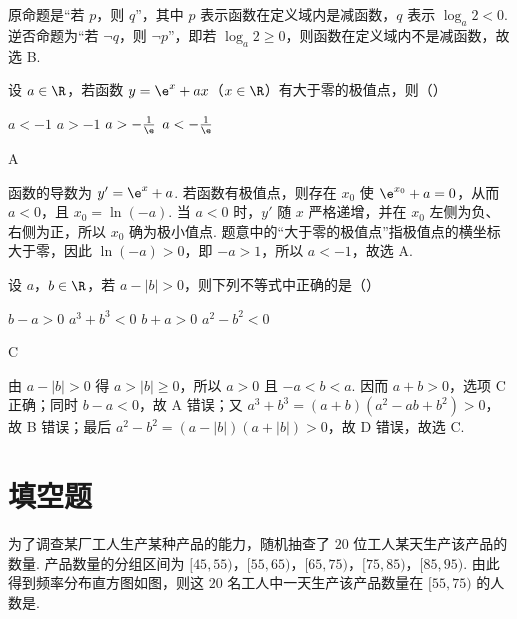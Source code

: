 \begin{solution}
原命题是“若 \(p\)，则 \(q\)”，其中 \(p\) 表示函数在定义域内是减函数，\(q\) 表示 \(\log_a2<0\). 逆否命题为“若 \(\lnot q\)，则 \(\lnot p\)”，即若 \(\log_a2\geqslant0\)，则函数在定义域内不是减函数，故选 B.
\end{solution}

\begin{problem}
设 \(a \in \R\)，若函数 \(y = \e^x + ax\)（\(x \in \R\)）有大于零的极值点，则（\quad）

\choices
    {\(a < -1\)}
    {\(a > -1\)}
    {\(a > -\frac{1}{\e}\)}
    {\(a < -\frac{1}{\e}\)}
\end{problem}

\begin{answer}
A
\end{answer}

\begin{solution}
函数的导数为 \(y'=\e^x+a\). 若函数有极值点，则存在 \(x_0\) 使 \(\e^{x_0}+a=0\)，从而 \(a<0\)，且 \(x_0=\ln(-a)\). 当 \(a<0\) 时，\(y'\) 随 \(x\) 严格递增，并在 \(x_0\) 左侧为负、右侧为正，所以 \(x_0\) 确为极小值点. 题意中的“大于零的极值点”指极值点的横坐标大于零，因此 \(\ln(-a)>0\)，即 \(-a>1\)，所以 \(a<-1\)，故选 A.
\end{solution}

\begin{problem}
设 \(a\)，\(b \in \R\)，若 \(a - |b| > 0\)，则下列不等式中正确的是（\quad）

\choices
    {\(b - a > 0\)}
    {\(a^3 + b^3 < 0\)}
    {\(b + a > 0\)}
    {\(a^2 - b^2 < 0\)}
\end{problem}

\begin{answer}
C
\end{answer}

\begin{solution}
由 \(a-|b|>0\) 得 \(a>|b|\geqslant0\)，所以 \(a>0\) 且 \(-a<b<a\). 因而 \(a+b>0\)，选项 C 正确；同时 \(b-a<0\)，故 A 错误；又
\(a^3+b^3=(a+b)(a^2-ab+b^2)>0\)，故 B 错误；最后 \(a^2-b^2=(a-|b|)(a+|b|)>0\)，故 D 错误，故选 C.
\end{solution}

\section{填空题}

\begin{problem}
为了调查某厂工人生产某种产品的能力，随机抽查了 \(20\) 位工人某天生产该产品的数量. 产品数量的分组区间为 \([45, 55)\)，\([55, 65)\)，\([65, 75)\)，\([75, 85)\)，\([85, 95)\). 由此得到频率分布直方图如图，则这 \(20\) 名工人中一天生产该产品数量在 \([55, 75)\) 的人数是\fillinblank{}.

\end{problem}

